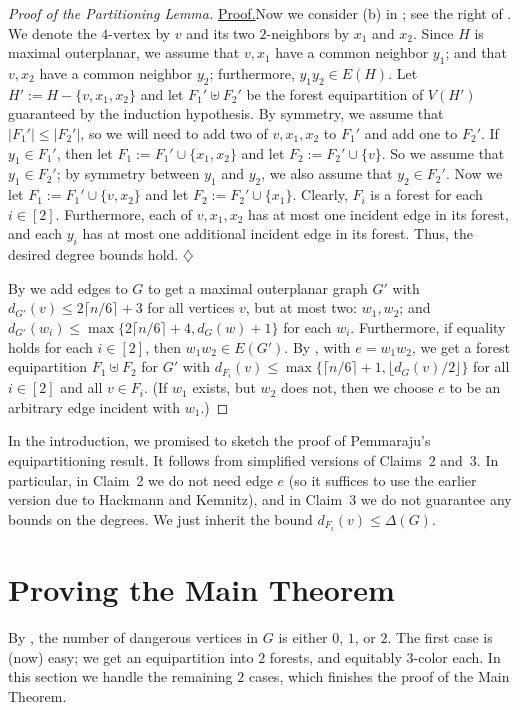 \documentclass[11pt]{article}
\theoremstyle{definition}
\newcommand\floor[1]{\lfloor#1\rfloor}
\newcommand\ceil[1]{\lceil#1\rceil}
\renewcommand\le\leqslant
\newenvironment{clmproof}[1]{\par\noindent\underline{Proof.}\space#1}{\leavevmode\unskip\penalty9999\hbox{}\nobreak\hfill\quad\hbox{$\diamondsuit$}\smallskip}
\begin{document}
\begin{proof}[Proof of the Partitioning Lemma]
\begin{clmproof}
	Now we consider (b) in ; see the right of .  We denote the $4$-vertex by $v$ and its two $2$-neighbors 
	by $x_1$ and $x_2$.  Since $H$ is maximal outerplanar, we assume that $v,x_1$ have a common neighbor $y_1$; and that $v,x_2$ have
	a common neighbor $y_2$; furthermore, $y_1y_2\in E(H)$.  Let $H':=H-\{v,x_1,x_2\}$ and let $F_1'\uplus F_2'$ be the forest equipartition of $V(H')$
	guaranteed by the induction hypothesis.  By symmetry, we assume that $|F_1'|\le |F_2'|$, so we will need to add two of $v,x_1,x_2$ to $F_1'$
	and add one to $F_2'$.  If $y_1\in F_1'$, then let $F_1:=F_1'\cup \{x_1,x_2\}$ and let $F_2:=F_2'\cup\{v\}$.  So we assume that $y_1\in F_2'$;
	by symmetry between $y_1$ and $y_2$, we also assume that $y_2\in F_2'$.  Now we let $F_1:=F_1'\cup \{v,x_2\}$ and let $F_2:=F_2'\cup\{x_1\}$.
	Clearly, $F_i$ is a forest for each $i\in[2]$.  Furthermore, each of $v,x_1,x_2$ has at most one incident edge in its forest, and each $y_i$
	has at most one additional incident edge in its forest.  Thus, the desired degree bounds hold.
\end{clmproof}

By  we add edges to $G$ to get a maximal outerplanar graph $G'$ with 
$d_{G'}(v)\le 2\ceil{n/6}+3$ for all vertices $v$, but at most two: $w_1,w_2$; and $d_{G'}(w_i)\le \max\{2\ceil{n/6}+4,d_G(w)+1\}$ 
for each $w_i$.
Furthermore, if equality holds for each $i\in[2]$, then $w_1w_2\in E(G')$.
By , with $e=w_1w_2$, we get a forest equipartition $F_1\uplus F_2$ for $G'$ with 
$d_{F_i}(v)\le \max\{\ceil{n/6}+1,\floor{d_G(v)/2}\}$ for all $i\in[2]$ and all $v\in F_i$.
(If $w_1$ exists, but $w_2$ does not, then we choose $e$ to be an arbitrary edge incident with $w_1$.)
\end{proof}

In the introduction, we promised to sketch the proof of Pemmaraju's equipartitioning result.  It follows from simplified versions of Claims~2 and~3.
In particular, in Claim~2 we do not need edge $e$ (so it suffices to use the earlier version due to Hackmann and Kemnitz), 
and in Claim~3 we do not guarantee any bounds on the degrees.  We just inherit the bound $d_{F_i}(v)\le \Delta(G)$.

\section{Proving the Main Theorem}
\label{s=6-sec}

By , the number of dangerous vertices in $G$ is either $0$, $1$, or $2$.
The first case is (now) easy; we get an equipartition into $2$ forests, and equitably $3$-color each.
In this section we handle the remaining $2$ cases, which finishes the proof of the Main Theorem.
\end{document}
